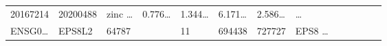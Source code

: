 \documentclass[
]{article}
\begin{document}
\begin{longtable}[]{@{}lllllllllllll@{}}
\begin{minipage}[t]{0.05\columnwidth}
20167214\strut
\end{minipage} & \begin{minipage}[t]{0.05\columnwidth}\raggedright
20200488\strut
\end{minipage} & \begin{minipage}[t]{0.05\columnwidth}\raggedright
zinc \ldots{}\strut
\end{minipage} & \begin{minipage}[t]{0.05\columnwidth}\raggedright
0.776\ldots{}\strut
\end{minipage} & \begin{minipage}[t]{0.05\columnwidth}\raggedright
1.344\ldots{}\strut
\end{minipage} & \begin{minipage}[t]{0.05\columnwidth}\raggedright
6.171\ldots{}\strut
\end{minipage} & \begin{minipage}[t]{0.05\columnwidth}\raggedright
2.586\ldots{}\strut
\end{minipage} & \begin{minipage}[t]{0.02\columnwidth}\raggedright
\ldots{}\strut
\end{minipage}\tabularnewline
\begin{minipage}[t]{0.05\columnwidth}\raggedright
ENSG0\ldots{}\strut
\end{minipage} & \begin{minipage}[t]{0.05\columnwidth}\raggedright
EPS8L2\strut
\end{minipage} & \begin{minipage}[t]{0.05\columnwidth}\raggedright
64787\strut
\end{minipage} & \begin{minipage}[t]{0.05\columnwidth}\raggedright
\strut
\end{minipage} & \begin{minipage}[t]{0.05\columnwidth}\raggedright
11\strut
\end{minipage} & \begin{minipage}[t]{0.05\columnwidth}\raggedright
694438\strut
\end{minipage} & \begin{minipage}[t]{0.05\columnwidth}\raggedright
727727\strut
\end{minipage} & \begin{minipage}[t]{0.05\columnwidth}\raggedright
EPS8 \ldots{}\strut
\end{minipage} & \begin{minipage}[t]{0.05\columnwidth}\raggedright

\end{minipage}
\end{longtable}
\end{document}
